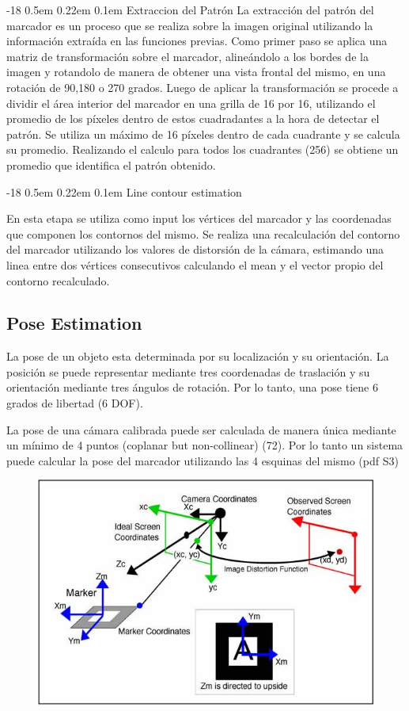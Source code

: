 \documentclass[runningheads]{llncs}
\makeatletter
\renewcommand\subsubsection{\@startsection{subsubsection}{3}{\z@}%
	{-18\p@ \@plus -4\p@ \@minus -4\p@}%
	{0.5em \@plus 0.22em \@minus 0.1em}%
	{\normalfont\normalsize\bfseries\boldmath}}
\makeatother
\begin{document}
\subsubsection{Extraccion del Patrón}
La extracción del patrón del marcador es un proceso que se realiza sobre la imagen original utilizando la información extraída en las funciones previas. Como primer paso se aplica una matriz de transformación sobre el marcador, alineándolo a los bordes de la imagen y rotandolo de manera de obtener una vista frontal del mismo, en una rotación de 90,180 o 270 grados. Luego de aplicar la transformación se procede a 
dividir el área interior del marcador en una grilla de 16 por 16, utilizando el promedio de los píxeles dentro de estos cuadradantes a la hora de detectar el patrón. Se utiliza un máximo de 16 píxeles dentro de cada cuadrante y se calcula su promedio. Realizando el calculo para todos los cuadrantes (256) se obtiene un promedio que identifica el patrón obtenido.


\subsubsection{Line contour estimation}

En esta etapa se utiliza como input los vértices del marcador y las coordenadas que componen los contornos del mismo. Se realiza una recalculación del contorno del marcador utilizando los valores de distorsión de la cámara, estimando una linea entre dos vértices consecutivos calculando el mean y el vector propio del contorno recalculado.
	
	
\subsection{Pose Estimation}

La pose de un objeto esta determinada por su localización y su orientación. La posición se puede representar mediante tres coordenadas de traslación y su orientación mediante tres ángulos de rotación. Por lo tanto, una pose tiene 6 grados de libertad (6 DOF).

La pose de una cámara calibrada puede ser calculada de manera única mediante un mínimo de 4 puntos (coplanar but non-collinear) (72). Por lo tanto un sistema puede calcular la pose del marcador utilizando las 4 esquinas del mismo (pdf S3)

\begin{figure}
	\centering
	\includegraphics[width=0.7\linewidth]{Imagenes/ar-coordenadas}
	\caption{}
\label{ar-coordenadas}
\end{figure}
\end{document}
